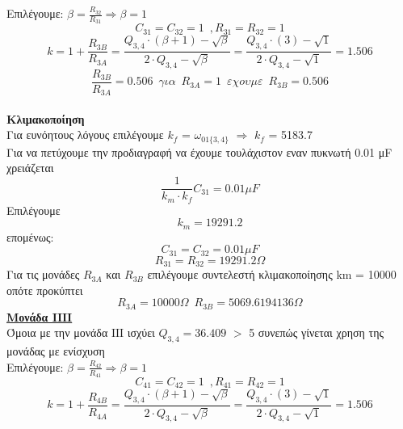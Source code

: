 \documentclass{article}
\begin{document}
{Επιλέγουμε: $β = \frac{R_{32}}{R_{31}} \Rightarrow β = 1$ 
\begin{equation*}
C_{31} = C_{32} = 1 \enspace ,R_{31} = R_{32} = 1
\end{equation*}
\begin{equation*}
k = 1 + \frac{R_{3B}}{R_{3A}} = \frac{Q_{3,4} \cdot (β+1) - \sqrt{β}}{2 \cdot Q_{3,4} - \sqrt{β}} = \frac{Q_{3,4} \cdot (3) - \sqrt{1}}{2 \cdot Q_{3,4} - \sqrt{1}} = 1.506
\end{equation*}
\begin{equation*}
\frac{R_{3B}}{R_{3A}} = 0.506\enspace για \enspace R_{3A} = 1 \enspace εχουμε \enspace R_{3B} = 0.506
\end{equation*}
\\[0.4\baselineskip]
\large{ {\textbf{Κλιμακοποίηση}} \\[0.4\baselineskip]}
\large{}
Για ευνόητους λόγους επιλέγουμε $k_f$ = $ω_{01\{3,4\}}$  $\Rightarrow$ $k_f$ = 5183.7 \\[0.4\baselineskip] 
Για να πετύχουμε την προδιαγραφή να έχουμε τουλάχιστον εναν πυκνωτή 0.01 μF χρειάζεται
\begin{equation*}
\frac{1}{k_m \cdot k_f} C_{31}= 0.01μF
\end{equation*}
Επιλέγουμε
\begin{equation*}
k_m = 19291.2
\end{equation*}
επομένως:
\begin{equation*}
\boxed{
C_{31} = C_{32} = 0.01μF
}
\end{equation*}
\begin{equation*}
\boxed{
R_{31} = R_{32} = 19291.2  Ω
}
\end{equation*}
Για τις μονάδες $R_{3A}$ και $R_{3B}$ επιλέγουμε συντελεστή κλιμακοποίησης km = 10000 οπότε προκύπτει
\begin{equation*}
\boxed{R_{3A} = 10000  Ω} \enspace \boxed{R_{3B} = 5069.6194136 Ω}
\end{equation*}
\large{ \underline{\textbf{Μονάδα ΙIΙΙ}} \\[0.4\baselineskip]}
\large{}
Όμοια με την μονάδα ΙΙΙ ισχύει $Q_{3,4} =36.409$ $>$ 5
συνεπώς γίνεται χρηση της μονάδας με ενίσχυση
\\[0.4\baselineskip]
Επιλέγουμε: $β = \frac{R_{42}}{R_{41}} \Rightarrow β = 1$ 
\begin{equation*}
C_{41} = C_{42} = 1 \enspace ,R_{41} = R_{42} = 1
\end{equation*}
\begin{equation*}
k = 1 + \frac{R_{4B}}{R_{4A}} = \frac{Q_{3,4} \cdot (β+1) - \sqrt{β}}{2 \cdot Q_{3,4} - \sqrt{β}} = \frac{Q_{3,4} \cdot (3) - \sqrt{1}}{2 \cdot Q_{3,4} - \sqrt{1}} =1.506

\end{equation*}}
\end{document}

